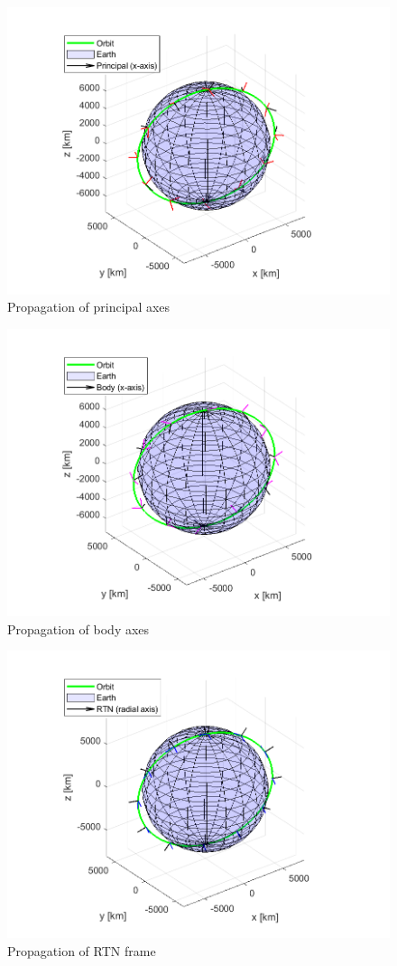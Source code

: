 \begin{figure}[H]
\centering
\includegraphics[scale=0.6]{Images/ps3_problem7c_principal.png}
\caption{Propagation of principal axes}
\label{fig:ps3_problem7c_principal}
\end{figure}

\begin{figure}[H]
\centering
\includegraphics[scale=0.6]{Images/ps3_problem7c_body.png}
\caption{Propagation of body axes}
\label{fig:ps3_problem7c_body}
\end{figure}

\begin{figure}[H]
\centering
\includegraphics[scale=0.6]{Images/ps3_problem7c_rtn.png}
\caption{Propagation of RTN frame}
\label{fig:ps3_problem7c_rtn}
\end{figure}
